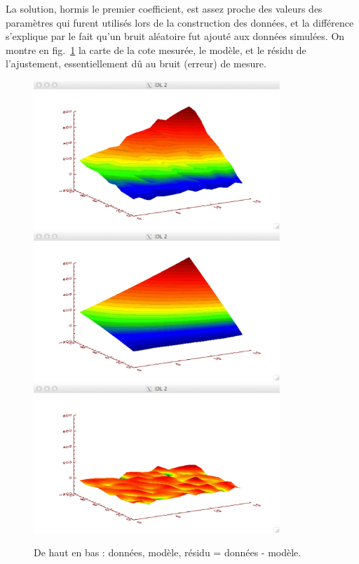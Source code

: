 La solution, hormis le premier coefficient, est assez proche des valeurs des paramètres qui furent utilisés lors de la construction des données, et la différence s'explique par le fait qu'un bruit aléatoire fut ajouté aux données simulées. On montre en fig.~\ref{fig:dmr} la carte de la cote mesurée, le modèle, et le résidu de l'ajustement, essentiellement dû au bruit (erreur) de mesure.
\begin{figure}[p]
   \centering
   \includegraphics[width=9.3cm]{assets/figures/exempleData.pdf}\vspace{5mm}
   \includegraphics[width=9.3cm]{assets/figures/exempleModel.pdf}\vspace{5mm}
   \includegraphics[width=9.3cm]{assets/figures/exempleResidu.pdf}
   \caption{De haut en bas : données, modèle, résidu = données - modèle.}
   \label{fig:dmr}
\end{figure}

